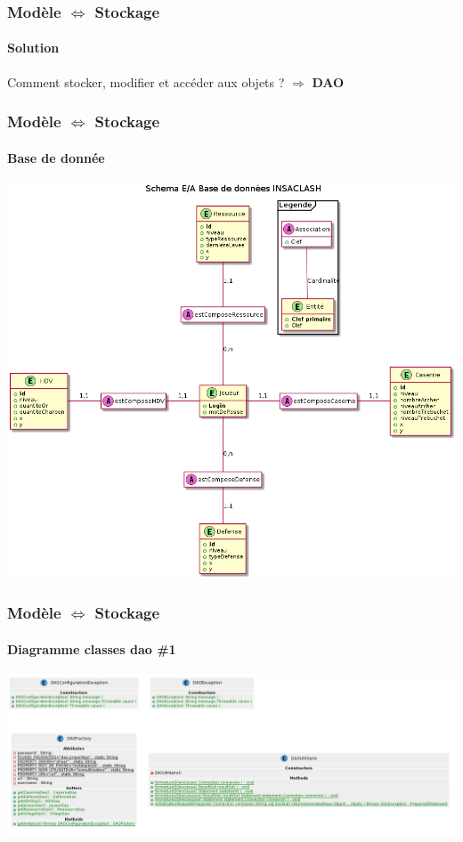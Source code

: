 \documentclass{beamer}
\begin{document}
    \begin{frame}
        \frametitle{Modèle $\Leftrightarrow$ Stockage}
        \framesubtitle{Solution}
        \begin{center}
            Comment stocker, modifier et accéder aux objets ? $\Rightarrow$ \textbf{DAO}
        \end{center}
    \end{frame}
    \begin{frame}
        \frametitle{Modèle $\Leftrightarrow$ Stockage}
        \framesubtitle{Base de donnée}
        \begin{center}
            \includegraphics[scale=0.24]{images/bdd.png}
        \end{center}
    \end{frame}
    \begin{frame}
        \frametitle{Modèle $\Leftrightarrow$ Stockage}
        \framesubtitle{Diagramme classes dao \#1}
        \begin{center}
            \includegraphics[scale=0.15]{images/Classesdao1.png}
        \end{center}
    \end{frame}
\end{document}
